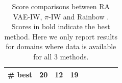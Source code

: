 \begin{table}[ht]
\begin{center}
\begin{small}
\begin{tabular}{lrrrrrrrl}
\midrule

\# best & 20 & 12 & 19 \\

\bottomrule

\end{tabular}
\end{small}
\end{center}
\caption{Score comparisons between RA VAE-IW, $\pi$-IW \cite{RLIW} and Rainbow \cite{rainbow2017}. Scores in bold indicate the best method. Here we only report results for domains where data is available for all 3 methods.} 
\label{tab:atari-piiw-rainbow}
\end{table}


